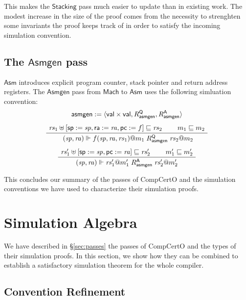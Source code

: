 \documentclass[sigplan,10pt,review,anonymous]{acmart}
\newcommand{\kw}[1]{\ensuremath{ \mathsf{#1} }}
\begin{document}
This makes the \kw{Stacking} pass
much easier to update than in existing work.
The modest increase in the size of the proof
comes from the necessity to strenghten
some invariants the proof keeps track of
in order to satisfy the incoming simulation convention.


\subsection{The \kw{Asmgen} pass} %

\kw{Asm} introduces explicit
program counter, stack pointer and return address registers.
The \kw{Asmgen} pass from \kw{Mach} to \kw{Asm}
uses the following simluation convention:
\begin{gather*}
  \kw{asmgen} := \langle \kw{val} \times \kw{val},
    R_\kw{asmgen}^\kw{Q}, R_\kw{asmgen}^\kw{A} \rangle
  \\[1ex]
  \AxiomC{$\mathit{rs}_1 \uplus
    [\kw{sp} := \mathit{sp}, \kw{ra} := \mathit{ra}, \kw{pc} := f]
    \sqsubseteq \mathit{rs}_2$}
  \AxiomC{$m_1 \sqsubseteq m_2$}
  \BinaryInfC{
    $(\mathit{sp}, \mathit{ra}) \Vdash
     f(\mathit{sp}, \mathit{ra}, \mathit{rs}_1)@m_1
     \mathrel{R_\kw{asmgen}^\kw{Q}}
     \mathit{rs}_2@m_2$}
  \DisplayProof
  \\[1ex]
  \AxiomC{$
    \mathit{rs}_1' \uplus [\kw{sp} := \mathit{sp}, \kw{pc} := \mathit{ra}]
    \sqsubseteq \mathit{rs}_2'$}
  \AxiomC{$m_1' \sqsubseteq m_2'$}
  \BinaryInfC{$
    (\mathit{sp}, \mathit{ra}) \Vdash \mathit{rs}_1'@m_1'
    \mathrel{R_\kw{asmgen}^\kw{A}}
    \mathit{rs}_2'@m_2'$}
  \DisplayProof
\end{gather*}

This concludes our summary of the passes of CompCertO
and the simulation conventions we have used
to characterize their simulation proofs.



\section{Simulation Algebra} \label{sec:simalg} %

We have described in \S\ref{sec:passes}
the passes of CompCertO
and the types of their simulation proofs.
In this section,
we show how they can be combined to establish
a satisfactory simulation theorem
for the whole compiler.

\subsection{Convention Refinement} %
\end{document}
